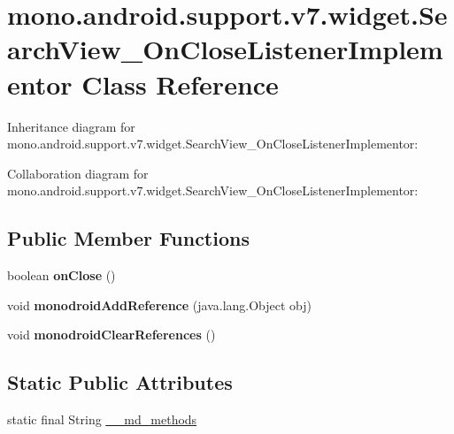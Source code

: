 \hypertarget{classmono_1_1android_1_1support_1_1v7_1_1widget_1_1_search_view___on_close_listener_implementor}{}\section{mono.\+android.\+support.\+v7.\+widget.\+Search\+View\+\_\+\+On\+Close\+Listener\+Implementor Class Reference}
\label{classmono_1_1android_1_1support_1_1v7_1_1widget_1_1_search_view___on_close_listener_implementor}


Inheritance diagram for mono.\+android.\+support.\+v7.\+widget.\+Search\+View\+\_\+\+On\+Close\+Listener\+Implementor\+:


Collaboration diagram for mono.\+android.\+support.\+v7.\+widget.\+Search\+View\+\_\+\+On\+Close\+Listener\+Implementor\+:
\subsection*{Public Member Functions}
\begin{DoxyCompactItemize}
\item 
\mbox{\label{classmono_1_1android_1_1support_1_1v7_1_1widget_1_1_search_view___on_close_listener_implementor_a5f434ffc99aab8b87c5cb0e0fbdde7bc}} 
boolean {\bfseries on\+Close} ()
\item 
\mbox{\label{classmono_1_1android_1_1support_1_1v7_1_1widget_1_1_search_view___on_close_listener_implementor_a5622e5a877333e34785ae8e8343ee55f}} 
void {\bfseries monodroid\+Add\+Reference} (java.\+lang.\+Object obj)
\item 
\mbox{\label{classmono_1_1android_1_1support_1_1v7_1_1widget_1_1_search_view___on_close_listener_implementor_a0b4a5624059750f110ead6d67deaad28}} 
void {\bfseries monodroid\+Clear\+References} ()
\end{DoxyCompactItemize}
\subsection*{Static Public Attributes}
\begin{DoxyCompactItemize}
\item 
static final String \hyperlink{classmono_1_1android_1_1support_1_1v7_1_1widget_1_1_search_view___on_close_listener_implementor_ade24b40287e42469422f6653a871f026}{\+\_\+\+\_\+md\+\_\+methods}
\end{DoxyCompactItemize}


